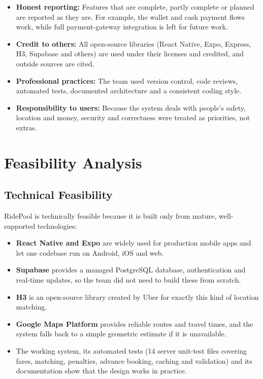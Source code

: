 \begin{itemize}
  \item \textbf{Honest reporting:} Features that are complete, partly complete
        or planned are reported as they are. For example, the wallet and cash
        payment flows work, while full payment-gateway integration is left for
        future work.
  \item \textbf{Credit to others:} All open-source libraries (React Native,
        Expo, Express, H3, Supabase and others) are used under their licenses
        and credited, and outside sources are cited.
  \item \textbf{Professional practices:} The team used version control, code
        reviews, automated tests, documented architecture and a consistent
        coding style.
  \item \textbf{Responsibility to users:} Because the system deals with
        people's safety, location and money, security and correctness were
        treated as priorities, not extras.
\end{itemize}

\section{Feasibility Analysis}
\label{sec:feasibility}

\subsection{Technical Feasibility}

RidePool is technically feasible because it is built only from mature,
well-supported technologies:

\begin{itemize}
  \item \textbf{React Native and Expo} are widely used for production mobile
        apps and let one codebase run on Android, iOS and web.
  \item \textbf{Supabase} provides a managed PostgreSQL database,
        authentication and real-time updates, so the team did not need to
        build these from scratch.
  \item \textbf{H3} is an open-source library created by Uber for exactly this
        kind of location matching.
  \item \textbf{Google Maps Platform} provides reliable routes and travel
        times, and the system falls back to a simple geometric estimate if it
        is unavailable.
  \item The working system, its automated tests (14 server unit-test files
        covering fares, matching, penalties, advance booking, caching and
        validation) and its documentation show that the design works in
        practice.
\end{itemize}

